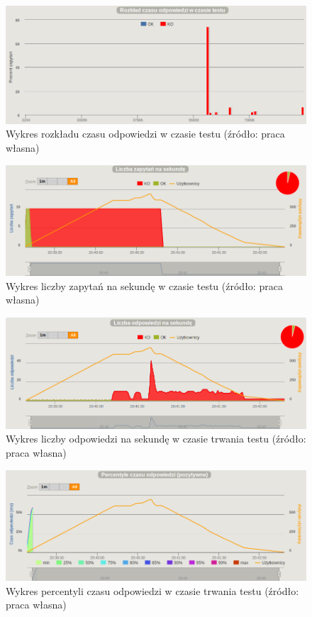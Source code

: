 \documentclass[12pt,twoside]{article}
\begin{document}
\begin{figure}[htbp]
\centering
\includegraphics[resolution=150]{test_results/js/fibonacci/screenshots/distribution.png}
\caption{Wykres rozkładu czasu odpowiedzi w czasie testu (źródło: praca własna)}
\end{figure}

\begin{figure}[htbp]
\centering
\includegraphics[resolution=150]{test_results/js/fibonacci/screenshots/requests.png}
\caption{Wykres liczby zapytań na sekundę w czasie testu (źródło: praca własna)}
\end{figure}

\begin{figure}[htbp]
\centering
\includegraphics[resolution=150]{test_results/js/fibonacci/screenshots/responses.png}
\caption{Wykres liczby odpowiedzi na sekundę w czasie trwania testu (źródło: praca własna)}
\end{figure}

\begin{figure}[htbp]
\centering
\includegraphics[resolution=150]{test_results/js/fibonacci/screenshots/response_percentile.png}
\caption{Wykres percentyli czasu odpowiedzi w czasie trwania testu (źródło: praca własna)}
\end{figure}
\end{document}
